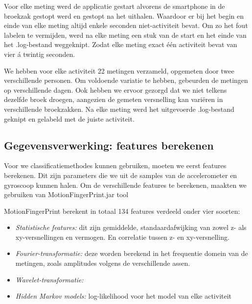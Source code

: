 \documentclass{article}
\begin{document}
Voor elke meting werd de applicatie gestart alvorens de smartphone in de broekzak gestopt werd en gestopt na het uithalen. Waardoor er bij het begin en einde van elke meting altijd enkele seconden niet-activiteit bevat. Om zo het fout labelen te vermijden, werd na elke meting een stuk van de start en het einde van het .log-bestand weggeknipt. Zodat elke meting exact \'e\'en activiteit bevat van vier \'a twintig seconden. 

We hebben voor elke activiteit 22 metingen verzameld, opgemeten door twee verschillende personen. Om voldoende variatie te hebben, gebeurden de metingen op verschillende dagen. Ook hebben we ervoor gezorgd dat we niet telkens dezelfde broek droegen, aangezien de gemeten versnelling kan vari\"eren in verschillende broekzakken. Na elke meting werd het uitgevoerde .log-bestand geknipt en gelabeld met de juiste activiteit.


\subsection{Gegevensverwerking: features berekenen}

Voor we classificatiemethodes kunnen gebruiken, moeten we eerst features berekenen. Dit zijn parameters die we uit de samples van de accelerometer en gyroscoop kunnen halen. Om de verschillende features te berekenen, maakten we gebruiken van MotionFingerPrint.jar tool %



MotionFingerPrint berekent in totaal 134 features verdeeld onder vier soorten:
\begin{itemize}
\item \textit{Statistische features:}
 dit zijn gemiddelde, standaardafwijking van zowel z- als xy-versnellingen en vermogen. En correlatie tussen z- en xy-versnelling.
 
\item \textit{Fourier-transformatie:} deze worden berekend in het frequentie domein van de metingen, zoals amplitudes volgens de verschillende assen.

\item \textit{Wavelet-transformatie:} %

\item \textit{Hidden Markov models:} log-likelihood voor het model van elke activiteit
\end{itemize}
\end{document}
